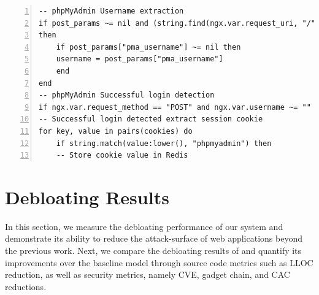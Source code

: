 \begin{lstlisting}[belowskip=-1em, caption=LUA configuration to detect successful logins and extract authentication cookies for phpMyAdmin,label=lst:lua,basicstyle=\footnotesize, language={[5.0]Lua},commentstyle=\color{commentsColor}\textit, numbers=left, xleftmargin=5.0ex, breaklines=true, float=t, floatplacement=t]
-- phpMyAdmin Username extraction
if post_params ~= nil and (string.find(ngx.var.request_uri, "/") or string.find(ngx.var.request_uri, "index.php")) 
then
    if post_params["pma_username"] ~= nil then
    username = post_params["pma_username"]
    end
end
-- phpMyAdmin Successful login detection
if ngx.var.request_method == "POST" and ngx.var.username ~= "" and ngx.status == 302 then
-- Successful login detected extract session cookie
for key, value in pairs(cookies) do
    if string.match(value:lower(), "phpmyadmin") then
    -- Store cookie value in Redis
\end{lstlisting}

\section{Debloating Results}
\label{sec:debloatingresults}

In this section, we measure the debloating performance of our system and demonstrate its ability to reduce the attack-surface of web applications beyond the previous work. 
Next, we compare the debloating results of \dbltr{} and quantify its improvements over the baseline model through source code metrics such as LLOC reduction, as well as security metrics, namely CVE, gadget chain, and CAC reductions. 


